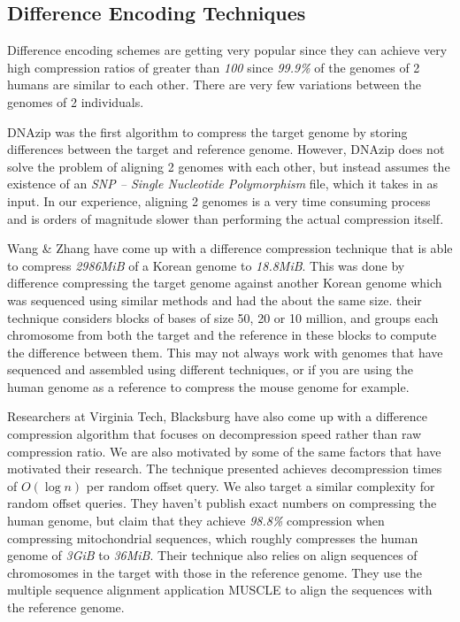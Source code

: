 \documentclass[11pt]{article}
\begin{document}
\subsection{Difference Encoding Techniques}

Difference encoding schemes are getting very popular since they can
achieve very high compression ratios of greater than \textit{100}
since \textit{99.9\%} of the genomes of 2 humans are similar to each
other. There are very few variations between the genomes of 2
individuals.

DNAzip\cite{dnazip}\cite{genomecompressionchenli} was the first
algorithm to compress the target genome by storing differences between
the target and reference genome. However, DNAzip does not solve the
problem of aligning 2 genomes with each other, but instead assumes the
existence of an \textit{SNP -- Single Nucleotide Polymorphism} file,
which it takes in as input. In our experience, aligning 2
genomes is a very time consuming process and is orders of magnitude
slower than performing the actual compression itself.

Wang \& Zhang\cite{wangzhang} have come up with a difference
compression technique that is able to compress \textit{2986MiB} of a
Korean genome to \textit{18.8MiB}. This was done by difference
compressing the target genome against another Korean genome which
was sequenced using similar methods and had the about the same
size. their technique considers blocks of bases of size 50, 20 or 10
million, and groups each chromosome from both the target and the
reference in these blocks to compute the difference between them. This
may not always work with genomes that have sequenced and assembled
using different techniques, or if you are using the human genome as a
reference to compress the mouse genome for example.

Researchers at Virginia Tech, Blacksburg\cite{vtechresearch} have
also come up with a difference compression algorithm that focuses on
decompression speed rather than raw compression ratio. We are also
motivated by some of the same factors that have motivated their
research. The technique presented achieves decompression times of
$O(\log{n})$ per random offset query. We also target a similar
complexity for random offset queries. They haven't publish exact
numbers on compressing the human genome, but claim that they achieve
\textit{98.8\%} compression when compressing mitochondrial sequences,
which roughly compresses the human genome of \textit{3GiB} to
\textit{36MiB}. Their technique also relies on align sequences of
chromosomes in the target with those in the reference genome. They use
the multiple sequence alignment application MUSCLE\cite{muscle} to
align the sequences with the reference genome.
\end{document}
